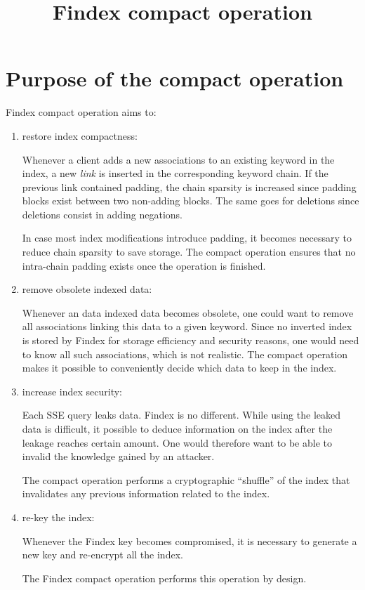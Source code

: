 \documentclass[11pt]{article}
\date{}
\title{Findex compact operation}
\begin{document}
\maketitle

\section{Purpose of the compact operation}
\label{sec:org2b2c1e9}
Findex compact operation aims to:
\begin{enumerate}
\item restore index compactness:

Whenever a client adds a new associations to an existing keyword in the
index, a new \emph{link} is inserted in the corresponding keyword chain. If the
previous link contained padding, the chain sparsity is increased since
padding blocks exist between two non-adding blocks. The same goes for
deletions since deletions consist in adding negations.

In case most index modifications introduce padding, it becomes necessary to
reduce chain sparsity to save storage. The compact operation ensures that no
intra-chain padding exists once the operation is finished.

\item remove obsolete indexed data:

Whenever an data indexed data becomes obsolete, one could want to remove all
associations linking this data to a given keyword. Since no inverted index is
stored by Findex for storage efficiency and security reasons, one would need
to know all such associations, which is not realistic. The compact operation
makes it possible to conveniently decide which data to keep in the index.

\item increase index security:

Each SSE query leaks data. Findex is no different. While using the leaked
data is difficult, it possible to deduce information on the index after the
leakage reaches certain amount. One would therefore want to be able to
invalid the knowledge gained by an attacker.

The compact operation performs a cryptographic ``shuffle'' of the index that
invalidates any previous information related to the index.

\item re-key the index:

Whenever the Findex key becomes compromised, it is necessary to generate a
new key and re-encrypt all the index.

The Findex compact operation performs this operation by design.
\end{enumerate}
\end{document}
